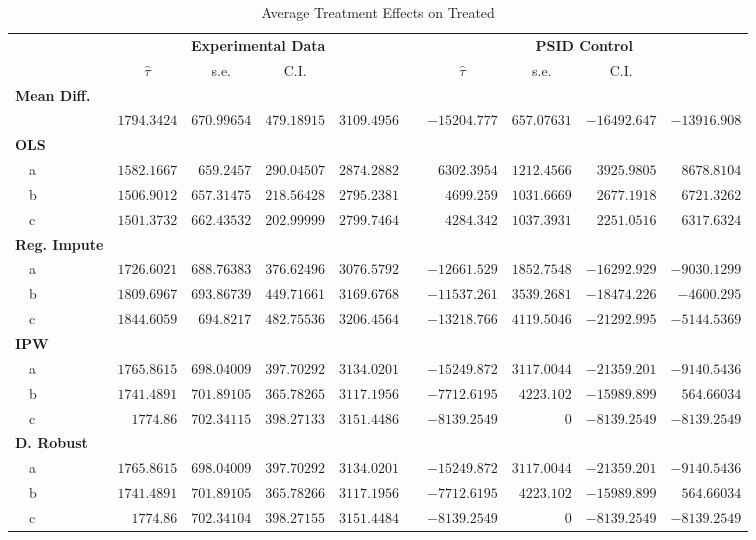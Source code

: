 \documentclass[12pt]{article}
\begin{document}
\begin{landscape}
\begin{table}
 \caption {Average Treatment Effects on Treated} \label{tab:title}
\begin{tabular}{lrrrrcrrrr}
\hline\hline
\multicolumn{1}{l}{\bfseries }&\multicolumn{4}{c}{\bfseries Experimental Data}&\multicolumn{1}{c}{\bfseries }&\multicolumn{4}{c}{\bfseries PSID Control}\tabularnewline
\cline{2-5} \cline{7-10}
\multicolumn{1}{l}{}&\multicolumn{1}{c}{$\hat{\tau}$}&\multicolumn{1}{c}{s.e.}&\multicolumn{1}{c}{C.I.}&\multicolumn{1}{c}{}&\multicolumn{1}{c}{}&\multicolumn{1}{c}{$\hat{\tau}$}&\multicolumn{1}{c}{s.e.}&\multicolumn{1}{c}{C.I.}&\multicolumn{1}{c}{}\tabularnewline
\hline
{\bfseries Mean Diff.}&&&&&&&&&\tabularnewline
 ~~&$ 1794.3424$&$ 670.99654$&$ 479.18915$&$ 3109.4956   $&&  $-15204.777$&$ 657.07631$&$-16492.647$&$-13916.908$ \tabularnewline
 \hline
 {\bfseries OLS}&&&&&&&&&\tabularnewline
 ~~a&$ 1582.1667$&$659.2457$&$ 290.04507$&$ 2874.2882 $&&   $ 6302.3954$&$ 1212.4566$&$ 3925.9805$&$ 8678.8104$ \tabularnewline
 ~~b&$ 1506.9012$&$ 657.31475$&$ 218.56428$&$ 2795.2381  $&&   $4699.259$&$ 1031.6669$&$ 2677.1918$&$ 6721.3262  $ \tabularnewline
 ~~c&$ 1501.3732$&$ 662.43532$&$ 202.99999$&$ 2799.7464  $&&   $4284.342$&$ 1037.3931$&$ 2251.0516$&$ 6317.6324  $ \tabularnewline
 \hline
 {\bfseries Reg. Impute}&&&&&&&&&\tabularnewline
 ~~a&$ 1726.6021$&$ 688.76383$&$ 376.62496$&$ 3076.5792  $&&   $-12661.529$&$ 1852.7548$&$-16292.929$&$-9030.1299$ \tabularnewline
 ~~b&$ 1809.6967$&$ 693.86739$&$ 449.71661$&$ 3169.6768  $&&   $-11537.261$&$ 3539.2681$&$-18474.226$&$ -4600.295$ \tabularnewline
 ~~c&$ 1844.6059$&$694.8217$&$ 482.75536$&$ 3206.4564 $&&   $-13218.766$&$ 4119.5046$&$-21292.995$&$-5144.5369$ \tabularnewline
 \hline
 {\bfseries IPW}&&&&&&&&&\tabularnewline
 ~~a&$ 1765.8615$&$ 698.04009$&$ 397.70292$&$ 3134.0201  $&&   $-15249.872$&$ 3117.0044$&$-21359.201$&$-9140.5436$ \tabularnewline
 ~~b&$ 1741.4891$&$ 701.89105$&$ 365.78265$&$ 3117.1956  $&&   $-7712.6195$&$4223.102$&$-15989.899$&$ 564.66034  $ \tabularnewline
~~c&$ 1774.86$&$ 702.34115$&$ 398.27133$&$ 3151.4486  $&&   $-8139.2549$&$ 0$&$-8139.2549$&$-8139.2549        $ \tabularnewline
\hline
{\bfseries D. Robust}&&&&&&&&&\tabularnewline
~~a&$ 1765.8615$&$ 698.04009$&$ 397.70292$&$ 3134.0201   $&&   $-15249.872$&$ 3117.0044$&$-21359.201$&$-9140.5436$ \tabularnewline
~~b&$ 1741.4891$&$ 701.89105$&$ 365.78266$&$ 3117.1956   $&&   $-7712.6195$&$4223.102$&$-15989.899$&$ 564.66034  $ \tabularnewline
~~c&$ 1774.86$&$ 702.34104$&$ 398.27155$&$ 3151.4484  $&&   $-8139.2549$&$ 0$&$-8139.2549$&$-8139.2549        $ \tabularnewline

\end{tabular}
\end{table}
\end{landscape}
\end{document}
